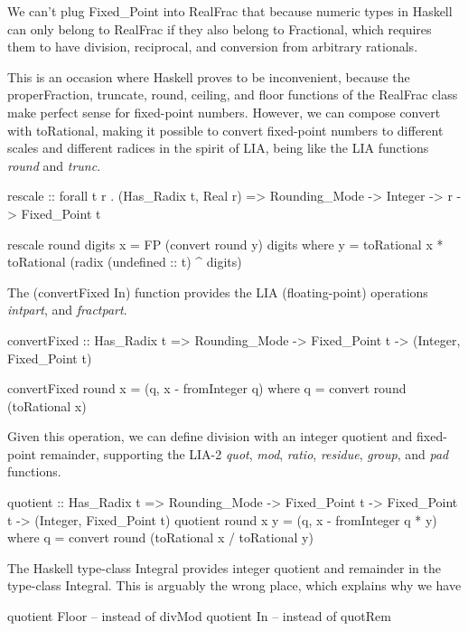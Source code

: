 \documentclass{article}
\begin{document}
We can't plug Fixed\_Point into RealFrac that because numeric types
in Haskell can only belong to RealFrac if they also belong to
Fractional, which requires them to have division, reciprocal,
and conversion from arbitrary rationals.

This is an occasion where Haskell proves to be inconvenient,
because the properFraction, truncate, round, ceiling, and floor
functions of the RealFrac class make perfect sense for
fixed-point numbers.  However, we can compose convert with
toRational, making it possible to convert fixed-point numbers
to different scales and different radices in the spirit of LIA,
being like  the LIA functions {\it round} and {\it trunc}.

\begin{code}
rescale :: forall t r . (Has_Radix t, Real r) =>
          Rounding_Mode -> Integer -> r -> Fixed_Point t

rescale round digits x = FP (convert round y) digits
  where y = toRational x * toRational (radix (undefined :: t) ^ digits)
\end{code}

The (convertFixed In) function provides the
LIA (floating-point) operations {\it intpart}, and {\it fractpart}.

\begin{code}
convertFixed :: Has_Radix t =>
    Rounding_Mode -> Fixed_Point t -> (Integer, Fixed_Point t)

convertFixed round x = (q, x - fromInteger q)
  where q = convert round (toRational x)
\end{code}

Given this operation, we can define division with an
integer quotient and fixed-point remainder, supporting
the LIA-2 {\it quot}, {\it mod}, {\it ratio}, {\it residue},
{\it group}, and {\it pad} functions.

\begin{code}
quotient :: Has_Radix t =>
    Rounding_Mode -> Fixed_Point t -> Fixed_Point t ->
    (Integer, Fixed_Point t)
quotient round x y = (q, x - fromInteger q * y)
  where q = convert round (toRational x / toRational y)
\end{code}

The Haskell type-class Integral provides integer quotient
and remainder in the type-class Integral.  This is arguably
the wrong place, which explains why we have
\begin{code}%
quotient Floor -- instead of divMod
quotient In    -- instead of quotRem
\end{code}
\end{document}
